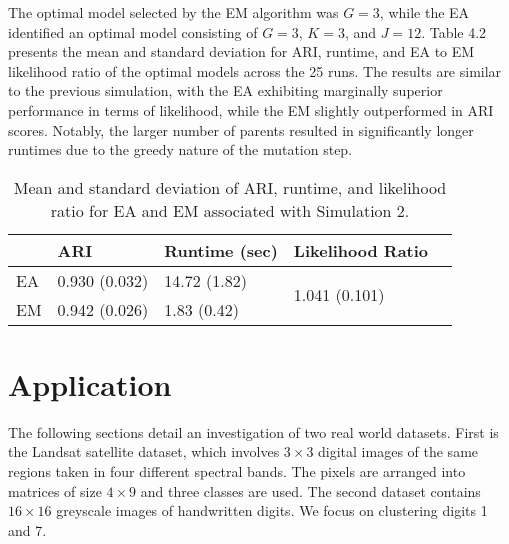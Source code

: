 \documentclass[12pt]{report}
\begin{document}
The optimal model selected by the EM algorithm was $G=3$, while the EA identified an optimal model consisting of $G=3$, $K=3$, and $J=12$. Table 4.2 presents the mean and standard deviation for ARI, runtime, and EA to EM likelihood ratio of the optimal models across the 25 runs. The results are similar to the previous simulation, with the EA exhibiting marginally superior performance in terms of likelihood, while the EM slightly outperformed in ARI scores. Notably, the larger number of parents resulted in significantly longer runtimes due to the greedy nature of the mutation step.

\begin{table}[!ht]
  \caption{Mean and standard deviation of ARI, runtime, and likelihood ratio for EA and EM associated with Simulation 2.}
    \vspace{0.5cm}
  \begin{tabularx}{\textwidth}{l *{3}{X}c}
  \toprule
    &\textbf{ARI}& \textbf{Runtime (sec)}  & \textbf{Likelihood Ratio} \\
  \midrule
  EA & 0.930 (0.032)     & 14.72 (1.82) & \multirow{2}{*}{1.041 (0.101)}  \\
  EM & 0.942 (0.026)    & 1.83 (0.42)   \\
  \bottomrule
  \end{tabularx}
\end{table}






\chapter{Application}
The following sections detail an investigation of two real world datasets. First is the Landsat satellite dataset, which involves $3 \times 3$ digital images of the same regions taken in four different spectral bands. The pixels are arranged into matrices of size $4 \times 9$ and three classes are used. The second dataset contains $16 \times 16$ greyscale images of handwritten digits. We focus on clustering digits 1 and 7.  




\end{document}
